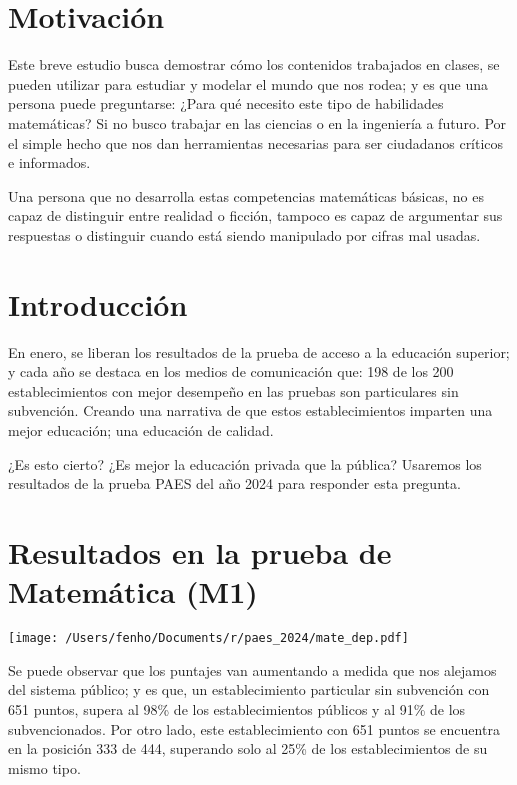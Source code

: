 \documentclass[sin nombre,con autor]{plantilla-evaluacion-v1}
\begin{document}
\section*{Motivación}
Este breve estudio busca demostrar cómo los contenidos trabajados en clases, se pueden
utilizar para estudiar y modelar el mundo que nos rodea; y es que una persona puede
preguntarse: ¿Para qué necesito este tipo de habilidades matemáticas? Si no busco
trabajar en las ciencias o en la ingeniería a futuro. Por el simple hecho que nos
dan herramientas necesarias para ser ciudadanos críticos e informados. \par

Una persona que no desarrolla estas competencias matemáticas básicas, no es capaz de
distinguir entre realidad o ficción, tampoco es capaz de argumentar sus respuestas o
distinguir cuando está siendo manipulado por cifras mal usadas.\par

\section*{Introducción}

En enero, se liberan los resultados de la prueba de acceso a la educación superior; y
cada año se destaca en los medios de comunicación que: 198 de los 200 establecimientos
con mejor desempeño en las pruebas son particulares sin subvención.  Creando una
narrativa de que estos establecimientos imparten una mejor educación; una educación
de calidad. \par

¿Es esto cierto? ¿Es mejor la educación privada que la pública? Usaremos los resultados
de la prueba PAES del año 2024 para responder esta pregunta. \par

\section*{Resultados en la prueba de Matemática (M1)}
\texttt{[image: /Users/fenho/Documents/r/paes\_2024/mate\_dep.pdf]}

Se puede observar que los puntajes van aumentando a medida que nos alejamos del
sistema público; y es que, un establecimiento particular sin subvención con 651 puntos,
supera al 98\% de los establecimientos públicos y al 91\% de los subvencionados. Por
otro lado, este
establecimiento con 651 puntos se encuentra en la posición 333 de 444,
superando solo al 25\% de los establecimientos de su mismo tipo.
\end{document}
